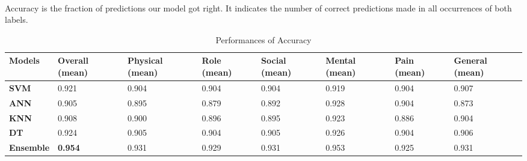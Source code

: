 \documentclass[runningheads]{llncs}
\begin{document}
\paragraph{}
Accuracy is the fraction of predictions our model got right. It indicates the number of correct predictions made in all occurrences of both labels. 
\begin{table}[h]
\begin{tabular}{|C{2cm}|C{1.5cm}|C{1.5cm}|C{1.5cm}|C{1.5cm}|C{1.5cm}|C{1.5cm}|C{1.5cm}|}
\hline
{} 
{\color[HTML]{333333} \textbf{Models}} & {\color[HTML]{333333} \textbf{Overall (mean)}} & {\color[HTML]{333333} \textbf{Physical (mean)}} & {\color[HTML]{333333} \textbf{Role (mean)}} &{\color[HTML]{333333} \textbf{Social (mean)}} & {\color[HTML]{333333} \textbf{Mental (mean)}} & {\color[HTML]{333333} \textbf{Pain (mean)}} & {\color[HTML]{333333} \textbf{General (mean)}} \\ \hline
{} 
\textbf{SVM} & 0.921  &0.904 & 0.904 & 0.904 & 0.919 & 0.904  & 0.907  \\ \hline
{} 
\textbf{ANN} & 0.905 & 0.895 & 0.879 & 0.892 & 0.928 & 0.904 & 0.873 \\ \hline
{} 
\textbf{KNN} & 0.908  & 0.900 & 0.896 & 0.895 & 0.923 & 0.886 & 0.904 \\ \hline
{} 
\textbf{DT} & 0.924 & 0.905 & 0.904  & 0.905 & 0.926 & 0.904 & 0.906 \\ \hline
{} 
\textbf{Ensemble} & \textbf{0.954} & 0.931 & 0.929  & 0.931  & 0.953 & 0.925 & 0.931  \\ \hline
\end{tabular}
\caption{Performances of Accuracy}
\label{Accuracy}
\end{table}
%
%
\end{document}
